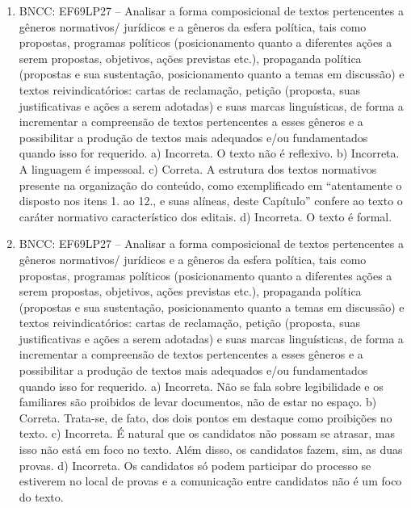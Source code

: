 \begin{enumerate}
\item
BNCC: EF69LP27 -- Analisar a forma composicional de textos pertencentes
a gêneros normativos/ jurídicos e a gêneros da esfera política, tais
como propostas, programas políticos (posicionamento quanto a diferentes
ações a serem propostas, objetivos, ações previstas etc.), propaganda
política (propostas e sua sustentação, posicionamento quanto a temas em
discussão) e textos reivindicatórios: cartas de reclamação, petição
(proposta, suas justificativas e ações a serem adotadas) e suas marcas
linguísticas, de forma a incrementar a compreensão de textos
pertencentes a esses gêneros e a possibilitar a produção de textos mais
adequados e/ou fundamentados quando isso for requerido.
a) Incorreta. O texto não é reflexivo.
b) Incorreta. A linguagem é impessoal.
c) Correta. A estrutura dos textos normativos presente na organização do
conteúdo, como exemplificado em ``atentamente o disposto nos itens 1. ao
12., e suas alíneas, deste Capítulo'' confere ao texto o caráter
normativo característico dos editais.
d) Incorreta. O texto é formal.

\item
BNCC: EF69LP27 -- Analisar a forma composicional de textos pertencentes
a gêneros normativos/ jurídicos e a gêneros da esfera política, tais
como propostas, programas políticos (posicionamento quanto a diferentes
ações a serem propostas, objetivos, ações previstas etc.), propaganda
política (propostas e sua sustentação, posicionamento quanto a temas em
discussão) e textos reivindicatórios: cartas de reclamação, petição
(proposta, suas justificativas e ações a serem adotadas) e suas marcas
linguísticas, de forma a incrementar a compreensão de textos
pertencentes a esses gêneros e a possibilitar a produção de textos mais
adequados e/ou fundamentados quando isso for requerido.
a) Incorreta. Não se fala sobre legibilidade e os familiares são
proibidos de levar documentos, não de estar no espaço.
b) Correta. Trata-se, de fato, dos dois pontos em destaque como
proibições no texto.
c) Incorreta. É natural que os candidatos não possam se atrasar, mas
isso não está em foco no texto. Além disso, os candidatos fazem, sim, as
duas provas.
d) Incorreta. Os candidatos só podem participar do processo se estiverem
no local de provas e a comunicação entre candidatos não é um foco do
texto.


\end{enumerate}
